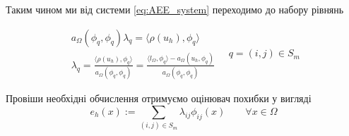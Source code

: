 Таким чином ми від системи \eqref{eq:AEE_system} переходимо до набору рівнянь

\begin{equation}
	\begin{split}
		a_\Omega(\phi_q, \phi_q) \lambda_q = \langle \rho(u_h), \phi_q \rangle\\
		\lambda_q = \frac{\langle \rho(u_h), \phi_q \rangle}{a_\Omega(\phi_q, \phi_q)}
			= \frac{\langle l_\Omega, \phi_q\rangle - a_\Omega(u_h, \phi_q)}{a_\Omega(\phi_q, \phi_q)}
	\end{split}
	\quad q = (i,j) \in S_m
\end{equation}

Провіши необхідні обчислення отримуємо оцінювач похибки у вигляді
\begin{equation}
	e_h(x) := \sum \limits_{(i,j) \in S_m} \lambda_{ij} \phi_{ij}(x) \qquad \forall x \in \Omega
\end{equation}
